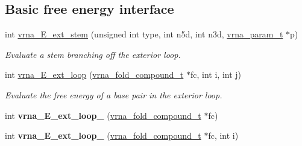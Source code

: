 \subsection*{Basic free energy interface}
\begin{DoxyCompactItemize}
\item 
int \mbox{\hyperlink{group__eval__loops__ext_gaa0c313c90da11aa741dcd62746d85337}{vrna\+\_\+\+E\+\_\+ext\+\_\+stem}} (unsigned int type, int n5d, int n3d, \mbox{\hyperlink{group__energy__parameters_ga8a69ca7d787e4fd6079914f5343a1f35}{vrna\+\_\+param\+\_\+t}} $\ast$p)
\begin{DoxyCompactList}\small\item\em Evaluate a stem branching off the exterior loop. \end{DoxyCompactList}\item 
int \mbox{\hyperlink{group__eval__loops__ext_gace51f32d5b34b7003b51c948afc6c207}{vrna\+\_\+\+E\+\_\+ext\+\_\+loop}} (\mbox{\hyperlink{group__fold__compound_ga1b0cef17fd40466cef5968eaeeff6166}{vrna\+\_\+fold\+\_\+compound\+\_\+t}} $\ast$fc, int i, int j)
\begin{DoxyCompactList}\small\item\em Evaluate the free energy of a base pair in the exterior loop. \end{DoxyCompactList}\item 
\mbox{\label{group__eval__loops__ext_gad26689b27fcaab5a1dcbd0d37d27ad5f}} 
int {\bfseries vrna\+\_\+\+E\+\_\+ext\+\_\+loop\+\_} (\mbox{\hyperlink{group__fold__compound_ga1b0cef17fd40466cef5968eaeeff6166}{vrna\+\_\+fold\+\_\+compound\+\_\+t}} $\ast$fc)
\item 
\mbox{\label{group__eval__loops__ext_ga6e57363a8ff3597cc69181c33fbb8196}} 
int {\bfseries vrna\+\_\+\+E\+\_\+ext\+\_\+loop\+\_} (\mbox{\hyperlink{group__fold__compound_ga1b0cef17fd40466cef5968eaeeff6166}{vrna\+\_\+fold\+\_\+compound\+\_\+t}} $\ast$fc, int i)
\end{DoxyCompactItemize}
